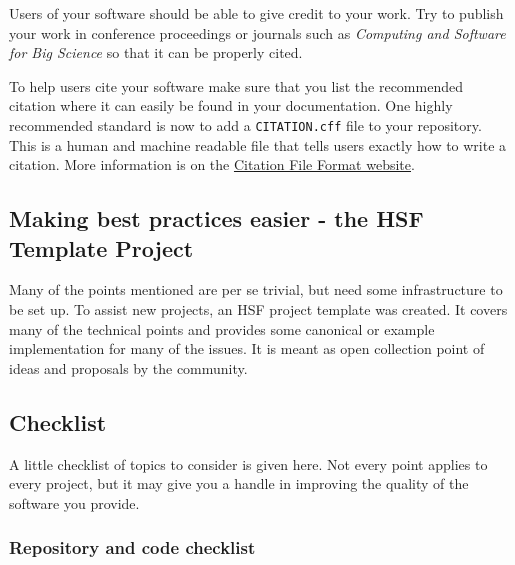 \documentclass[12pt,a4paper]{article}
\begin{document}
Users of your software should be able to give credit to your work. Try
to publish your work in conference proceedings or journals such as
\emph{Computing and Software for Big Science} so that it can be properly
cited.

To help users cite your software make sure that you list the recommended
citation where it can easily be found in your documentation. One highly
recommended standard is now to add a \texttt{CITATION.cff} file to your
repository. This is a human and machine readable file that tells users
exactly how to write a citation. More information is on the
\href{https://citation-file-format.github.io}{Citation File Format
website}.

\subsection{Making best practices easier - the HSF Template
Project}\label{making-best-practices-easier---the-hsf-template-project}

Many of the points mentioned are per se trivial, but need some
infrastructure to be set up. To assist new projects, an HSF project
template was created. It covers many of the technical points and
provides some canonical or example implementation for many of the
issues. It is meant as open collection point of ideas and proposals by
the community.

\subsection{Checklist}\label{checklist}

A little checklist of topics to consider is given here. Not every point
applies to every project, but it may give you a handle in improving the
quality of the software you provide.

\subsubsection{Repository and code
checklist}\label{repository-and-code-checklist}
\end{document}
